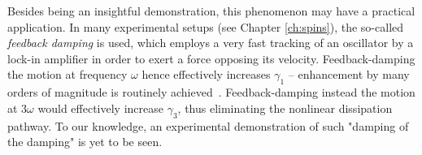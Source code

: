Besides being an insightful demonstration, this phenomenon may have a practical application. In many experimental setups (see Chapter \ref{ch:spins}), the so-called \textit{feedback damping} is used, which employs a very fast tracking of an oscillator by a lock-in amplifier in order to exert a force opposing its velocity. Feedback-damping the motion at frequency $\omega$ hence effectively increases $\gamma_1$ -- enhancement by many orders of magnitude is routinely achieved~\cite{Courty_2001, Kleckner_2006, Poggio_2007, Rossi_2018}.
Feedback-damping instead the motion at $3\omega$ would effectively increase $\gamma_3$, thus eliminating the nonlinear dissipation pathway. To our knowledge, an experimental demonstration of such "damping of the damping" is yet to be seen. 
